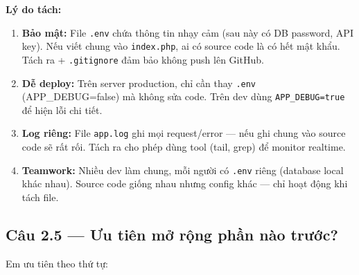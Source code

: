 \documentclass[12pt,a4paper]{article}
\begin{document}
\textbf{Lý do tách:}

\begin{enumerate}
    \item \textbf{Bảo mật:} File \texttt{.env} chứa thông tin nhạy cảm (sau này có DB password, API key). Nếu viết chung vào \texttt{index.php}, ai có source code là có hết mật khẩu. Tách ra + \texttt{.gitignore} đảm bảo không push lên GitHub.

    \item \textbf{Dễ deploy:} Trên server production, chỉ cần thay \texttt{.env} (APP\_DEBUG=false) mà không sửa code. Trên dev dùng \texttt{APP\_DEBUG=true} để hiện lỗi chi tiết.

    \item \textbf{Log riêng:} File \texttt{app.log} ghi mọi request/error — nếu ghi chung vào source code sẽ rất rối. Tách ra cho phép dùng tool (tail, grep) để monitor realtime.

    \item \textbf{Teamwork:} Nhiều dev làm chung, mỗi người có \texttt{.env} riêng (database local khác nhau). Source code giống nhau nhưng config khác — chỉ hoạt động khi tách file.
\end{enumerate}

\newpage

\subsection{Câu 2.5 — Ưu tiên mở rộng phần nào trước?}

Em ưu tiên theo thứ tự:
\end{document}
